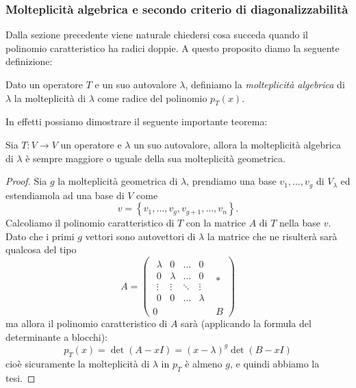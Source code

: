 \documentclass[11pt]{scrartcl}
\begin{document}
   	 \subsubsection{Molteplicità algebrica e secondo criterio di diagonalizzabilità}
   	 Dalla sezione precedente viene naturale chiedersi cosa succeda quando il polinomio caratteristico ha radici doppie. A questo proposito diamo la seguente definizione:
   	 \begin{definition}
   	 	Dato un operatore $T$ e un suo autovalore $\lambda$, definiamo la \textit{molteplicità algebrica} di $\lambda$ la molteplicità di $\lambda$ come radice del polinomio $p_T(x)$.
   	 \end{definition}
   	 In effetti possiamo dimostrare il seguente importante teorema:
   	 \begin{theorem}
   	 	Sia $T:V\to V$ un operatore e $\lambda$ un suo autovalore, allora la molteplicità algebrica di $\lambda$ è sempre maggiore o uguale della sua molteplicità geometrica.
   	 \end{theorem}
   	 \begin{proof}
   	 	Sia $g$ la molteplicità geometrica di $\lambda$, prendiamo una base $v_1,\dots,v_g$ di $V_\lambda$ ed estendiamola ad una base di $V$ come $$v=\left\{v_1,\dots,v_g,v_{g+1},\dots, v_n\right\}.$$
   	 	Calcoliamo il polinomio caratteristico di $T$ con la matrice $A$ di $T$ nella base $v$. Dato che i primi $g$ vettori sono autovettori di $\lambda$ la matrice che ne risulterà sarà qualcosa del tipo
   	 	$$A=
   	 	\left(
   	 	\begin{array}{c|c}
   	 		\begin{array}{cccc}
   	 			\lambda & 0 & \dots & 0 \\
   	 			0 & \lambda & \dots & 0 \\
   	 			\vdots & \vdots & \ddots & \vdots \\
   	 			0 & 0 & \dots & \lambda
   	 		\end{array} & * \\
   	 		\hline
   	 		0 & B 
   	 	\end{array}
   	 	\right)
   	 	$$
   	 	ma allora il polinomio caratteristico di $A$ sarà (applicando la formula del determinante a blocchi):
   	 	$$p_T(x)=\det\left(A-xI\right)=(x-\lambda)^g\det\left(B-xI\right)$$
   	 	cioè sicuramente la molteplicità di $\lambda$ in $p_T$ è almeno $g$, e quindi abbiamo la tesi.
   	 \end{proof}
\end{document}
